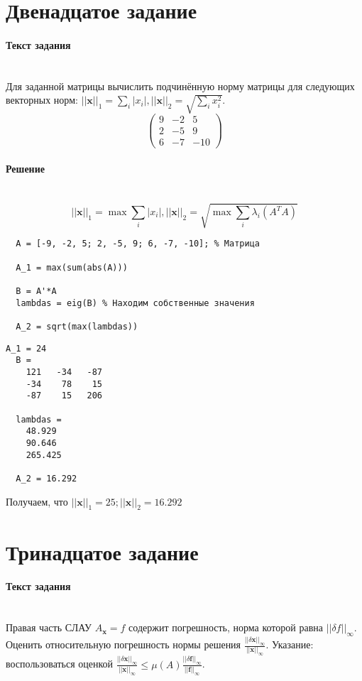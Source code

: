 \section{Двенадцатое задание}
\paragraph{Текст задания} ~\\
Для заданной матрицы вычислить подчинённую норму матрицы для следующих векторных норм: $ ||\textbf{x}||_{1} = \sum_{i}|x_{i}|, ||\textbf{x}||_{2} = \sqrt{\sum_{i} x_{i}^{2}}$.\\
\[
  \begin{pmatrix}
    9 & -2 & 5\\
    2 & -5 & 9\\
    6 & -7 & -10
  \end{pmatrix}
\]

\paragraph{Решение} ~\\
\[
  ||\textbf{x}||_{1} = \max \sum_{i} |x_{i}|, ||\textbf{x}||_{2} = \sqrt{\max \sum_{i} \lambda_{i} (A^{T}A)}
\]
\begin{lstlisting}
  A = [-9, -2, 5; 2, -5, 9; 6, -7, -10]; % Матрица

  A_1 = max(sum(abs(A)))

  B = A'*A
  lambdas = eig(B) % Находим собственные значения

  A_2 = sqrt(max(lambdas))
\end{lstlisting}
\begin{lstlisting}[backgroundcolor=\color{cyan}]
  A_1 = 24
  B =
    121   -34   -87
    -34    78    15
    -87    15   206

  lambdas =
    48.929
    90.646
    265.425

  A_2 = 16.292
\end{lstlisting}
Получаем, что $||\textbf{x}||_{1} = 25; ||\textbf{x}||_{2} = 16.292$

\section{Тринадцатое задание}
\paragraph{Текст задания} ~\\
Правая часть СЛАУ $A_{\textbf{x}} = f$ содержит погрешность, норма которой равна $||\delta f||_{\infty}$. Оценить относительную погрешность нормы решения $\frac{||\delta \textbf{x}||_{\infty}}{||\textbf{x}||_{\infty}}$. Указание: воспользоваться оценкой $\frac{|| \delta \textbf{x}||_{\infty}}{||\textbf{x}||_{\infty}} \leq \mu(A) \frac{||\delta \textbf{f}||_{\infty}}{||\textbf{f}||_{\infty}}$.

